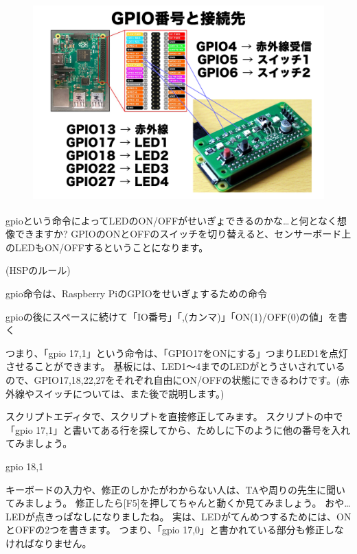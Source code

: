 \begin{figure}[H]
    \begin{center}
        \includegraphics[keepaspectratio,width=12.409cm,height=7.62cm]{text02-img/text02-img025.png}
    \end{center}
\end{figure}

gpioという命令によってLEDのON/OFFがせいぎょできるのかな…と何となく想像できますか?
GPIOのONとOFFのスイッチを切り替えると、センサーボード上のLEDもON/OFFするということになります。

\begin{description}
    \item (HSPのルール)
\end{description}

\begin{description}
    \item gpio命令は、Raspberry PiのGPIOをせいぎょするための命令
    \item gpioの後にスペースに続けて「IO番号」「,(カンマ)」「ON(1)/OFF(0)の値」を書く
\end{description}
\noindent
つまり、「gpio 17,1」という命令は、「GPIO17をONにする」つまりLED1を点灯させることができます。
基板には、LED1〜4までのLEDがとうさいされているので、GPIO17,18,22,27をそれぞれ自由にON/OFFの状態にできるわけです。(赤外線やスイッチについては、また後で説明します。)

スクリプトエディタで、スクリプトを直接修正してみます。
スクリプトの中で「gpio 17,1」と書いてある行を探してから、ためしに下のように他の番号を入れてみましょう。

\begin{description}
    \item gpio 18,1
\end{description}
\noindent
キーボードの入力や、修正のしかたがわからない人は、TAや周りの先生に聞いてみましょう。
修正したら[F5]を押してちゃんと動くか見てみましょう。
おや…LEDが点きっぱなしになりましたね。
実は、LEDがてんめつするためには、ONとOFFの2つを書きます。
つまり、「gpio 17,0」と書かれている部分も修正しなければなりません。

